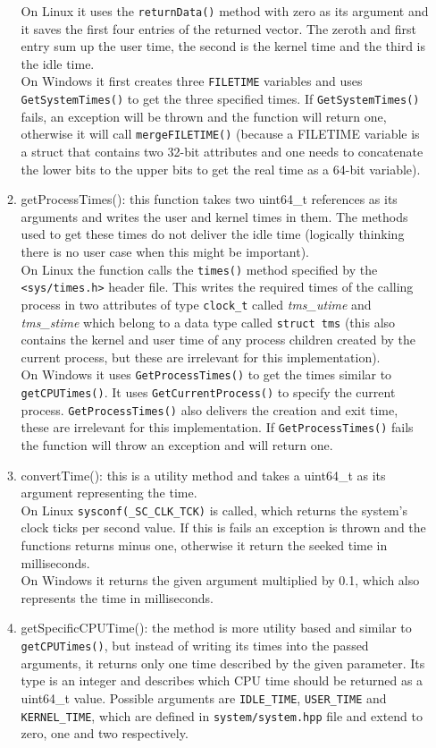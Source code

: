 \begin{enumerate}
\begin{enumerate}
		On Linux it uses the \texttt{returnData()} method with zero as its argument and it saves the first four entries of the returned vector. The zeroth and first entry sum up the user time, the second is the kernel time and the third is the idle time.\\
		On Windows it first creates three \texttt{FILETIME} variables and uses \texttt{GetSystemTimes()} to get the three specified times. If \texttt{GetSystemTimes()} fails, an exception will be thrown and the function will return one, otherwise it will call \texttt{mergeFILETIME()} (because a FILETIME variable is a struct that contains two 32-bit attributes and one needs to concatenate the lower bits to the upper bits to get the real time as a 64-bit variable).
		\item getProcessTimes(): this function takes two uint64\_t references as its arguments and writes the user and kernel times in them. The methods used to get these times do not deliver the idle time (logically thinking there is no user case when this might be important).\\
		On Linux the function calls the \texttt{times()} method specified by the \texttt{<sys/times.h>} header file. This writes the required times of the calling process in two attributes of type \texttt{clock\_t} called \textit{tms\_utime} and \textit{tms\_stime} which belong to a  data type called \texttt{struct tms} (this also contains the kernel and user time of any process children created by the current process, but these are irrelevant for this implementation).\\
		On Windows it uses \texttt{GetProcessTimes()} to get the times similar to \texttt{getCPUTimes()}. It uses \texttt{GetCurrentProcess()} to specify the current process. \texttt{GetProcessTimes()} also delivers the creation and exit time, these are irrelevant for this implementation. If \texttt{GetProcessTimes()} fails the function will throw an exception and will return one.
		\item convertTime(): this is a utility method and takes a uint64\_t as its argument representing the time. \\
		On Linux \texttt{sysconf(\_SC\_CLK\_TCK)} is called, which returns the system's clock ticks per second value. If this is fails an exception is thrown and the functions returns minus one, otherwise it return the seeked time in milliseconds.\\
		On Windows it returns the given argument multiplied by 0.1, which also represents the time in milliseconds.
		\item getSpecificCPUTime(): the method is more utility based and similar to \texttt{getCPUTimes()}, but instead of writing its times into the passed arguments, it returns only one time described by the given parameter. Its type is an integer and describes which CPU time should be returned as a uint64\_t value. Possible arguments are \texttt{IDLE\_TIME}, \texttt{USER\_TIME} and \texttt{KERNEL\_TIME}, which are defined in \texttt{system/system.hpp} file and extend to zero, one and two respectively.

\end{enumerate}
\end{enumerate}
